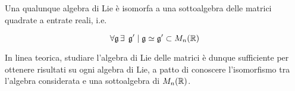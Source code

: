 \begin{theorem}
	Una qualunque algebra di Lie è isomorfa a una sottoalgebra delle matrici quadrate a entrate reali, i.e.
	
	\begin{equation}
		\forall \mathfrak{g} \, \exists \;\,  \mathfrak{g}' \mid \mathfrak{g} \simeq \mathfrak{g}' \subset M_{n}(\mathbb{R})
	\end{equation}
\end{theorem}

In linea teorica, studiare l'algebra di Lie delle matrici è dunque sufficiente per ottenere risultati su ogni algebra di Lie, a patto di conoscere l'isomorfismo tra l'algebra considerata e una sottoalgebra di $ M_{n}(\mathbb{R}) $.
